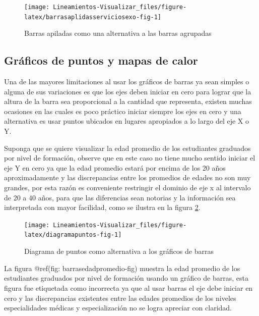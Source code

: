 \documentclass[
]{book}
\begin{document}
\begin{figure}

{\centering \texttt{[image: Lineamientos-Visualizar\_files/figure-latex/barrasaplidasserviciosexo-fig-1]} 

}

\caption{Barras apiladas como una alternativa a las barras agrupadas}\label{fig:barrasaplidasserviciosexo-fig}
\end{figure}

\hypertarget{gruxe1ficos-de-puntos-y-mapas-de-calor}{%
\subsection{Gráficos de puntos y mapas de calor}\label{gruxe1ficos-de-puntos-y-mapas-de-calor}}

Una de las mayores limitaciones al usar los gráficos de barras ya sean simples o alguna de sus variaciones es que los ejes deben iniciar en cero para lograr que la altura de la barra sea proporcional a la cantidad que representa, existen muchas ocasiones en las cuales es poco práctico iniciar siempre los ejes en cero y una alternativa es usar puntos ubicados en lugares apropiados a lo largo del eje X o Y.

Suponga que se quiere visualizar la edad promedio de los estudiantes graduados por nivel de formación, observe que en este caso no tiene mucho sentido iniciar el eje Y en cero ya que la edad promedio estará por encima de los 20 años aproximadamente y las discrepancias entre los promedios de edades no son muy grandes, por esta razón es conveniente restringir el dominio de eje x al intervalo de 20 a 40 años, para que las diferencias sean notorias y la información sea interpretada con mayor facilidad, como se ilustra en la figura \ref{fig:diagramapuntos-fig}.

\begin{figure}

{\centering \texttt{[image: Lineamientos-Visualizar\_files/figure-latex/diagramapuntos-fig-1]} 

}

\caption{Diagrama de puntos como alternativa a los gráficos de barras}\label{fig:diagramapuntos-fig}
\end{figure}

La figura @ref(fig: barrasedadpromedio-fig) muestra la edad promedio de los estudiantes graduados por nivel de formación usando un gráfico de barras, esta figura fue etiquetada como incorrecta ya que al usar barras el eje debe iniciar en cero y las discrepancias existentes entre las edades promedios de los niveles especialidades médicas y especialización no se logra apreciar con claridad.
\end{document}
